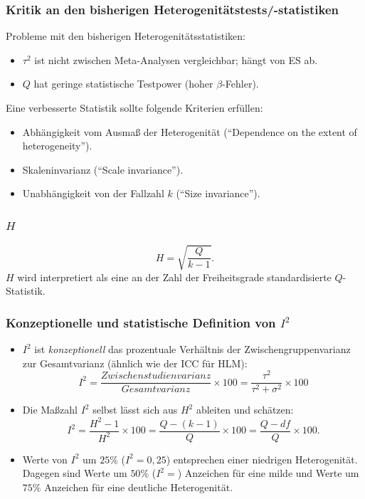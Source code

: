 \begin{frame}
  \frametitle{Kritik an den bisherigen Heterogenitätstests/-statistiken}
  Probleme mit den bisherigen Heterogenitätsstatistiken:
  \begin{itemize}[<+->]
  \item $\tau^2$ ist nicht zwischen Meta-Analysen vergleichbar; hängt von ES ab.
  \item $Q$ hat geringe statistische Testpower (hoher $\beta$-Fehler).
  \end{itemize}
  \pause
  Eine verbesserte Statistik sollte folgende Kriterien erfüllen:
   \begin{itemize}[<+->]
    \item Abhängigkeit vom Ausmaß der Heterogenität ("`Dependence on the extent of heterogeneity"').
    \item Skaleninvarianz ("`Scale invariance"').
    \item Unabhängigkeit von der Fallzahl $k$ ("`Size invariance"').
  \end{itemize}

\citep[Quelle: ][]{higgins_quantifying_2002}

\end{frame}

\begin{frame}
  \frametitle{$H$}
%
\begin{equation}
  \label{eq:hetero-h-statistic}
  H=\sqrt{\frac{Q}{k-1}}.
\end{equation}
$H$ wird interpretiert als eine an der Zahl der Freiheitsgrade standardisierte $Q$-Statistik.
\end{frame}


\begin{frame}[shrink = 5]
  \frametitle{Konzeptionelle und statistische Definition von $I^2$}
  \begin{itemize}
  \item $I^2$ ist \emph{konzeptionell} das prozentuale Verhältnis der
    Zwischengruppenvarianz zur Gesamtvarianz (ähnlich wie der ICC für HLM):
    \begin{equation*}
      I^2 = \frac{Zwischenstudienvarianz}{Gesamtvarianz}\times 100 =  \frac{\tau^2}{\tau^2 + \sigma^2}\times 100
    \end{equation*}

  \item Die Maßzahl $I^2$ selbst lässt sich aus $H^2$ ableiten und schätzen:
    \begin{equation*}
      \label{eq:hetero-i-statistic}
      I^2=\frac{H^2-1}{H^2} \times 100 = \frac{Q-(k-1)}{Q} \times 100 = \frac{Q-df}{Q} \times 100.
    \end{equation*}
  \item Werte von $I^2$ um $25\%$ ($I^2=0,25$) entsprechen einer niedrigen Heterogenität. Dagegen sind Werte um $50\%$
    ($I^2 = $) Anzeichen für eine milde und Werte um $75\%$ Anzeichen für eine deutliche Heterogenität.
  \end{itemize}
\end{frame}



